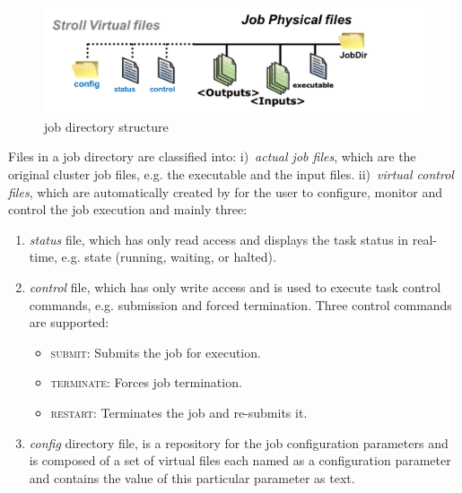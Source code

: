 \begin{figure}[htbp]
	\centering
	\includegraphics[width=.9\linewidth]{figures/job-structure}                
\caption{\name job directory structure}
\label{fig:job-structure}
\end{figure}

Files in a \name job directory are classified into: i)~\textit{actual job files}, which are the original cluster job files, e.g. the executable and the input files. ii)~\textit{virtual control files}, which are automatically created by \name for the user to configure, monitor and control the job execution and mainly three:
\begin{enumerate}
    \item \textit{status} file, which has only read access and displays the task status in real-time, e.g. state (running, waiting, or halted).
	 \item \textit{control} file, which has only write access and is used to execute task control commands, e.g. submission and forced termination. Three control commands are supported:
	 \begin{itemize}
		\item \textsc{submit}: Submits the job for execution.
		\item \textsc{terminate}: Forces job termination.  
		\item \textsc{restart}: Terminates the job and re-submits it.  
	\end{itemize}
	  \item \textit{config} directory file, is a repository for the job configuration parameters and is composed of a set of virtual files each named as a configuration parameter and contains the value of this particular parameter as text. 

\end{enumerate}
